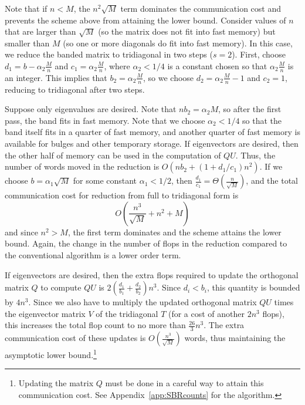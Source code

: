 \documentclass{article}
\def\lt{\left}
\def\rt{\right}
\theoremstyle{definition}
\begin{document}
Note that if $n<M$, the $n^2\sqrt M$ term dominates the communication cost and prevents the scheme above from attaining the lower bound.  Consider values of $n$ that are larger than $\sqrt M$ (so the matrix does not fit into fast memory) but smaller than $M$ (so one or more diagonals do fit into fast memory).  In this case, we reduce the banded matrix to tridiagonal in two steps ($s=2$).  First, choose $d_1 = b - \alpha_2\frac Mn$ and $c_1 = \alpha_2\frac Mn$, where $\alpha_2<1/4$ is a constant chosen so that $\alpha_2 \frac Mn$ is an integer.  This implies that $b_2 = \alpha_2 \frac Mn$, so we choose $d_2 = \alpha_2\frac Mn -1$ and $c_2=1$, reducing to tridiagonal after two steps.

Suppose only eigenvalues are desired.  Note that $nb_2 = \alpha_2 M$, so after the first pass, the band fits in fast memory.  Note that we choose $\alpha_2<1/4$ so that the band itself fits in a quarter of fast memory, and another quarter of fast memory is available for bulges and other temporary storage.  If eigenvectors are desired, then the other half of memory can be used in the computation of $QU$.  Thus, the number of words moved in the reduction is $O(nb_2 + (1+d_1/c_1)n^2)$.  If we choose $b=\alpha_1 \sqrt M$ for some constant $\alpha_1 < 1/2$, then $\frac{d_1}{c_1}=\Theta\lt(\frac{n}{\sqrt M}\rt)$, and the total communication cost for reduction from full to tridiagonal form is
$$O\lt(\frac{n^3}{\sqrt M} + n^2 +M\rt)$$
and since $n^2>M$, the first term dominates and the scheme attains the lower bound.  Again, the change in the number of flops in the reduction compared to the conventional algorithm is a lower order term.

If eigenvectors are desired, then the extra flops required to update the orthogonal matrix $Q$ to compute $QU$ is $2(\frac{d_1}{b_1}+\frac{d_2}{b_2})n^3$.  Since $d_i < b_i$, this quantity is bounded by $4n^3$.  Since we also have to multiply the updated orthogonal matrix $QU$ times the eigenvector matrix $V$ of the tridiagonal $T$ (for a cost of another $2n^3$ flops), this increases the total flop count to no more than $\frac{26}{3}n^3$.  The extra communication cost of these updates is $O\lt(\frac{n^3}{\sqrt M}\rt)$ words, thus maintaining the asymptotic lower bound.\footnote{Updating the matrix $Q$ must be done in a careful way to attain this communication cost.  See Appendix~\ref{app:SBRcounts} for the algorithm.}
\end{document}

